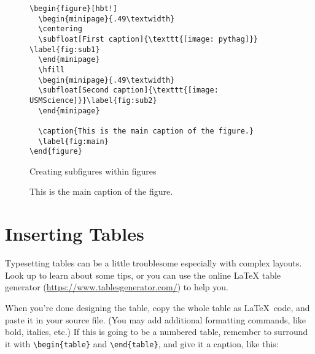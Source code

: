 \begin{figure}[hbt!]
\begin{lstlisting}
\begin{figure}[hbt!]
  \begin{minipage}{.49\textwidth}
  \centering
  \subfloat[First caption]{\texttt{[image: pythag]}} \label{fig:sub1}
  \end{minipage}
  \hfill
  \begin{minipage}{.49\textwidth}
  \subfloat[Second caption]{\texttt{[image: USMScience]}}\label{fig:sub2}
  \end{minipage}
  
  \caption{This is the main caption of the figure.}
  \label{fig:main}
\end{figure}
\end{lstlisting}
\caption{Creating subfigures within figures}
\end{figure}

\begin{figure}[hbt!]
  \begin{minipage}{.49\textwidth}
  \centering
   \label{fig:sub1}
  \end{minipage}
  \hfill
  \begin{minipage}{.49\textwidth}
  \label{fig:sub2}
  \end{minipage}
  
  \caption{This is the main caption of the figure.}
  \label{fig:main}
\end{figure}

\section{Inserting Tables}

Typesetting tables can be a little troublesome especially with complex layouts.  Look up \citet{roberts} to learn about some tips, or you can use the online \LaTeX{} table generator (\url{https://www.tablesgenerator.com/}) to help you.

When you're done designing the table, copy the whole table as \LaTeX\ code, and paste it in your source file.  (You may add additional formatting commands, like bold, italics, etc.)  If this is going to be a numbered table, remember to surround it with \verb|\begin{table}| and \verb|\end{table}|, and give it a caption, like this:

